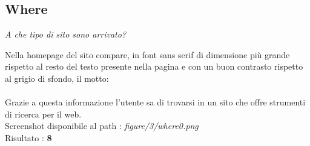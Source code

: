 \subsection{Where}
\begin{center}

\textit{A che tipo di sito sono arrivato?}

\end{center}
\begin{flushleft}
Nella homepage del sito compare, in font sans serif di dimensione
più grande rispetto al resto del testo presente nella pagina e con un buon
contrasto rispetto al grigio di sfondo, il motto: \\
 \\
Grazie a questa informazione l'utente sa di trovarsi in un sito che offre
strumenti di ricerca per il web. \\
Screenshot disponibile al path : \textit{figure/3/where0.png} \\
Risultato : \textbf{8}
\end{flushleft}